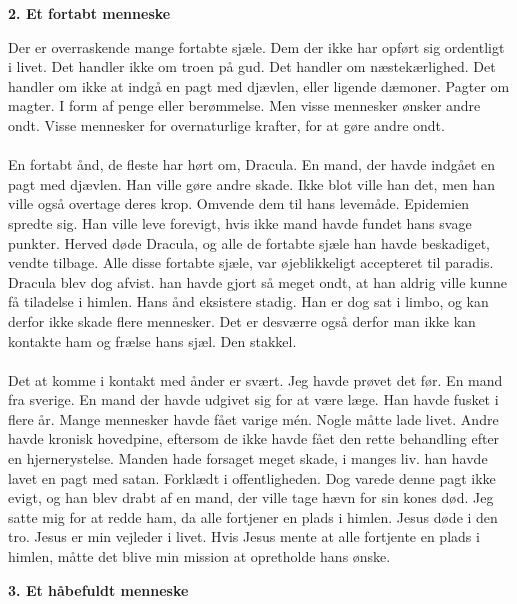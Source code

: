 \documentclass[]{article}
\begin{document}
\begin{center}
	\large\textbf{2. Et fortabt menneske}
\end{center}

Der er overraskende mange fortabte sjæle. Dem der ikke har opført sig ordentligt i livet. Det handler ikke om troen på gud. Det handler om næstekærlighed. Det handler om ikke at indgå en pagt med djævlen, eller ligende dæmoner. Pagter om magter. I form af penge eller berømmelse. Men visse mennesker ønsker andre ondt. Visse mennesker for overnaturlige krafter, for at gøre andre ondt. 
\\ \\
En fortabt ånd, de fleste har hørt om, Dracula. En mand, der havde indgået en pagt med djævlen. Han ville gøre andre skade. Ikke blot ville han det, men han ville også overtage deres krop. Omvende dem til hans levemåde. Epidemien spredte sig. Han ville leve forevigt, hvis ikke mand havde fundet hans svage punkter. Herved døde Dracula, og alle de fortabte sjæle han havde beskadiget, vendte tilbage. Alle disse fortabte sjæle, var øjeblikkeligt accepteret til paradis. Dracula blev dog afvist. han havde gjort så meget ondt, at han aldrig ville kunne få tiladelse i himlen. Hans ånd eksistere stadig. Han er dog sat i limbo, og kan derfor ikke skade flere mennesker. Det er desværre også derfor man ikke kan kontakte ham og frælse hans sjæl. Den stakkel.
\\ \\
Det at komme i kontakt med ånder er svært. Jeg havde prøvet det før. En mand fra sverige. En mand der havde udgivet sig for at være læge. Han havde fusket i flere år. Mange mennesker havde fået varige mén. Nogle måtte lade livet. Andre havde kronisk hovedpine, eftersom de ikke havde fået den rette behandling efter en hjernerystelse. Manden hade forsaget meget skade, i manges liv. han havde lavet en pagt med satan. Forklædt i offentligheden. Dog varede denne pagt ikke evigt, og han blev drabt af en mand, der ville tage hævn for sin kones død. Jeg satte mig for at redde ham, da alle fortjener en plads i himlen. Jesus døde i den tro. Jesus er min vejleder i livet. Hvis Jesus mente at alle fortjente en plads i himlen, måtte det blive min mission at opretholde hans ønske.

\begin{center}
	\large\textbf{3. Et håbefuldt menneske}
\end{center}
\end{document}
